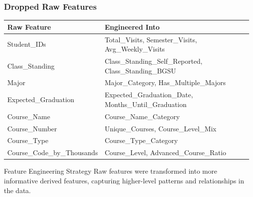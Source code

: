 \documentclass{beamer}
\begin{document}
\begin{frame}
\frametitle{Dropped Raw Features}
    \noindent
    \hspace{-1cm}
    \small
    \begin{tabular}{>{\columncolor{bgsubrown!20}}l l}
    \toprule
    \textbf{Raw Feature} & \textbf{Engineered Into} \\
    \midrule
    Student\_IDs & Total\_Visits, Semester\_Visits, Avg\_Weekly\_Visits \\
    \midrule
    Class\_Standing & Class\_Standing\_Self\_Reported, Class\_Standing\_BGSU \\
    \midrule
    Major & Major\_Category, Has\_Multiple\_Majors \\
    \midrule
    Expected\_Graduation & Expected\_Graduation\_Date, Months\_Until\_Graduation \\
    \midrule
    Course\_Name & Course\_Name\_Category \\
    \midrule
    Course\_Number & Unique\_Courses, Course\_Level\_Mix \\
    \midrule
    Course\_Type & Course\_Type\_Category \\
    \midrule
    Course\_Code\_by\_Thousands & Course\_Level, Advanced\_Course\_Ratio \\
    \midrule
    \end{tabular}

    \begin{alertblock}{Feature Engineering Strategy}
        Raw features were transformed into more informative derived features, capturing higher-level patterns and relationships in the data.
    \end{alertblock}
\end{frame}
\end{document}
